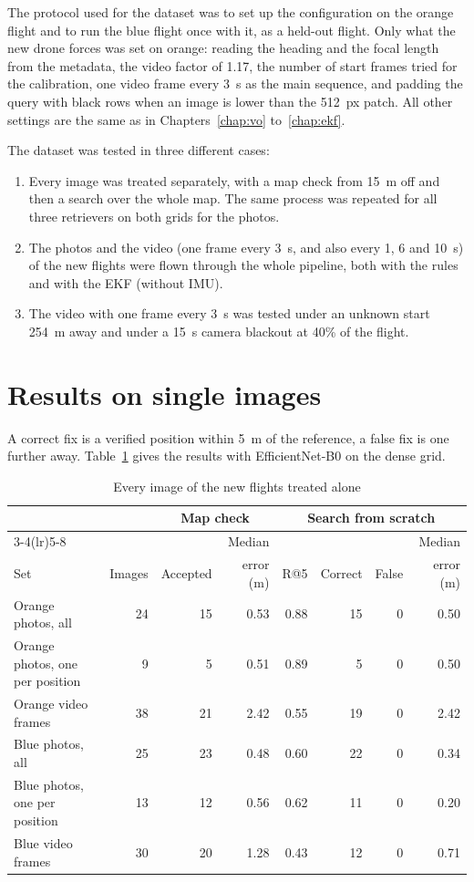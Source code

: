 \documentclass[english, Lau, oneside]{sapthesis}%
\begin{document}
The protocol used for the dataset was to set up the configuration on the orange flight and to run the blue flight once with it, as a held-out flight. Only what the new drone forces was set on orange: reading the heading and the focal length from the metadata, the video factor of 1.17, the number of start frames tried for the calibration, one video frame every 3~s as the main sequence, and padding the query with black rows when an image is lower than the 512~px patch. All other settings are the same as in Chapters~\ref{chap:vo} to~\ref{chap:ekf}.

The dataset was tested in three different cases:
\begin{enumerate}
\item Every image was treated separately, with a map check from 15~m off and then a search over the whole map. The same process was repeated for all three retrievers on both grids for the photos.
\item The photos and the video (one frame every 3~s, and also every 1, 6 and 10~s) of the new flights were flown through the whole pipeline, both with the rules and with the EKF (without IMU).
\item The video with one frame every 3~s was tested under an unknown start 254~m away and under a 15~s camera blackout at 40\% of the flight.
\end{enumerate}

\section{Results on single images}
\label{sec:real-single}
A correct fix is a verified position within 5~m of the reference, a false fix is one further away. Table~\ref{tab:real-single} gives the results with EfficientNet-B0 on the dense grid.

\begin{table}[!htbp]
  \centering
  \caption{Every image of the new flights treated alone}
  \label{tab:real-single}
  \footnotesize\setlength{\tabcolsep}{3.5pt}
  \begin{tabular}{lrrrrrrr}
    \toprule
     & & \multicolumn{2}{c}{Map check} & \multicolumn{4}{c}{Search from scratch} \\
    \cmidrule(lr){3-4}\cmidrule(lr){5-8}
     & & & Median & & & & Median \\
    Set & Images & Accepted & error (m) & R@5 & Correct & False & error (m) \\
    \midrule
    Orange photos, all & 24 & 15 & 0.53 & 0.88 & 15 & 0 & 0.50 \\
    Orange photos, one per position & 9 & 5 & 0.51 & 0.89 & 5 & 0 & 0.50 \\
    Orange video frames & 38 & 21 & 2.42 & 0.55 & 19 & 0 & 2.42 \\
    \addlinespace
    Blue photos, all & 25 & 23 & 0.48 & 0.60 & 22 & 0 & 0.34 \\
    Blue photos, one per position & 13 & 12 & 0.56 & 0.62 & 11 & 0 & 0.20 \\
    Blue video frames & 30 & 20 & 1.28 & 0.43 & 12 & 0 & 0.71 \\
    \bottomrule
  \end{tabular}
\end{table}
\end{document}
